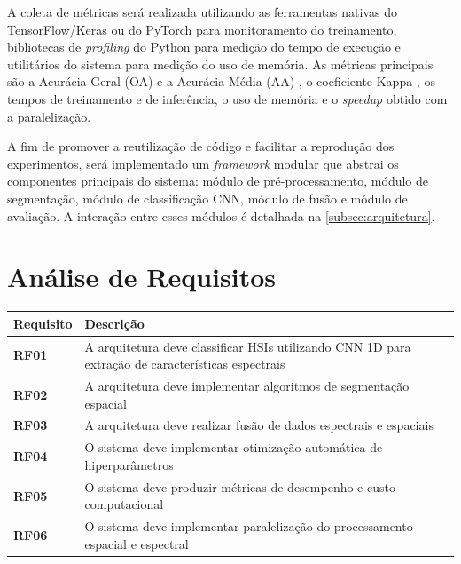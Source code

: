 A coleta de métricas será realizada utilizando as ferramentas nativas do TensorFlow/Keras ou do PyTorch para monitoramento do treinamento, bibliotecas de \textit{profiling} do Python para medição do tempo de execução e utilitários do sistema para medição do uso de memória. As métricas principais são a Acurácia Geral (OA) e a Acurácia Média (AA) \cite{Congalton1991}, o coeficiente Kappa \cite{Cohen1960}, os tempos de treinamento e de inferência, o uso de memória e o \textit{speedup} obtido com a paralelização.

A fim de promover a reutilização de código e facilitar a reprodução dos experimentos, será implementado um \textit{framework} modular que abstrai os componentes principais do sistema: módulo de pré-processamento, módulo de segmentação, módulo de classificação CNN, módulo de fusão e módulo de avaliação. A interação entre esses módulos é detalhada na \autoref{subsec:arquitetura}.

\section{Análise de Requisitos}
\label{sec:req}

\begin{quadro}[H]
    \centering
    \caption{Requisitos funcionais}
    \begin{tabular}{|p{}|p{}|}
        \hline
        \rowcolor[HTML]{C0C0C0}
        \textbf{Requisito} & \textbf{Descrição}  \\
        \hline
        
        \textbf{RF01} & A arquitetura deve classificar HSIs utilizando CNN 1D para extração de características espectrais \\ 
        \hline

        \textbf{RF02} & A arquitetura deve implementar algoritmos de segmentação espacial \\
        \hline

        \textbf{RF03} & A arquitetura deve realizar fusão de dados espectrais e espaciais \\
        \hline
        
        \textbf{RF04} & O sistema deve implementar otimização automática de hiperparâmetros \\
        \hline

        \textbf{RF05} & O sistema deve produzir métricas de desempenho e custo computacional \\
        \hline
        
        \textbf{RF06} & O sistema deve implementar paralelização do processamento espacial e espectral \\
        \hline
    \end{tabular}
    \label{tab:rf}
\end{quadro}

